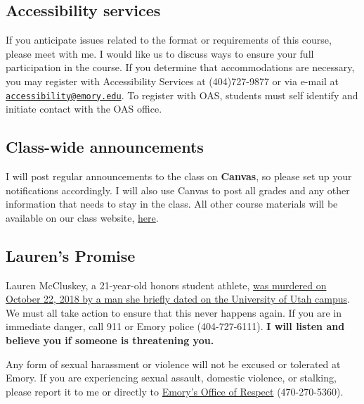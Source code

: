 \documentclass[11pt,]{article}
\begin{document}
\hypertarget{accessibility-services}{%
\subsection{Accessibility services}\label{accessibility-services}}

If you anticipate issues related to the format or requirements of this
course, please meet with me. I would like us to discuss ways to ensure
your full participation in the course. If you determine that
accommodations are necessary, you may register with Accessibility
Services at (404)727-9877 or via e-mail at
\href{mailto:accessibility@emory.edu}{\nolinkurl{accessibility@emory.edu}}.
To register with OAS, students must self identify and initiate contact
with the OAS office.

\hypertarget{class-wide-announcements}{%
\subsection{Class-wide announcements}\label{class-wide-announcements}}

I will post regular announcements to the class on \textbf{Canvas}, so
please set up your notifications accordingly. I will also use Canvas to
post all grades and any other information that needs to stay in the
class. All other course materials will be available on our class
website, \href{https://econ372s23.classes.ianmccarthyecon.com/}{here}.

\hypertarget{laurens-promise}{%
\subsection{Lauren's Promise}\label{laurens-promise}}

Lauren McCluskey, a 21-year-old honors student athlete,
\href{https://www.sltrib.com/opinion/commentary/2019/02/10/commentary-failing-lauren/}{was
murdered on October 22, 2018 by a man she briefly dated on the
University of Utah campus}. We must all take action to ensure that this
never happens again. If you are in immediate danger, call 911 or Emory
police (404-727-6111). \textbf{I will listen and believe you if someone
is threatening you.}

Any form of sexual harassment or violence will not be excused or
tolerated at Emory. If you are experiencing sexual assault, domestic
violence, or stalking, please report it to me or directly to
\href{http://respect.emory.edu/index.html}{Emory's Office of Respect}
(470-270-5360).
\end{document}
